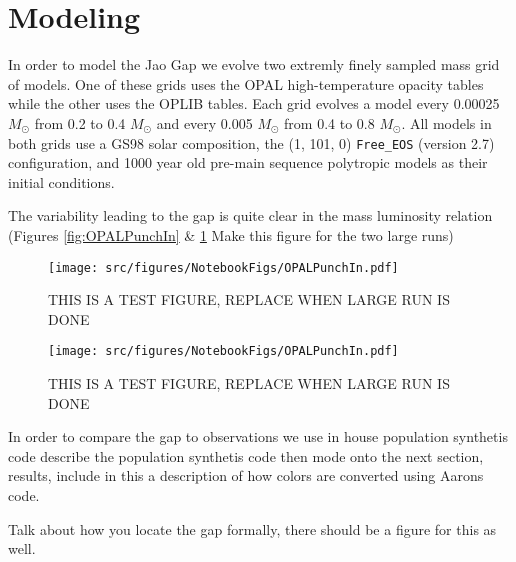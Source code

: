 \section{Modeling}\label{sec:modeling}
In order to model the Jao Gap we evolve two extremly finely sampled mass grid
of models. One of these grids uses the OPAL high-temperature opacity tables
while the other uses the OPLIB tables. Each grid evolves a model every 0.00025
$M_{\odot}$ from 0.2 to 0.4 $M_{\odot}$ and every 0.005 $M_{\odot}$ from 0.4 to
0.8 $M_{\odot}$. All models in both grids use a GS98 solar composition, the (1,
101, 0) \texttt{Free\_EOS} (version {\color{red}2.7}) configuration, and 1000
year old pre-main sequence polytropic models as their initial conditions.

The variability leading to the gap is quite clear in the mass luminosity
relation (Figures \ref{fig:OPALPunchIn} \& \ref{fig:OPLIBPunchIn}
{\color{red} Make this figure for the two large runs})

\begin{figure}
	\centering
	\texttt{[image: src/figures/NotebookFigs/OPALPunchIn.pdf]}
	\caption{{\color{red} THIS IS A TEST FIGURE, REPLACE WHEN LARGE RUN IS DONE}}
	\label{fig:OPALPunchIn}
	\texttt{[image: src/figures/NotebookFigs/OPALPunchIn.pdf]}
	\caption{{\color{red} THIS IS A TEST FIGURE, REPLACE WHEN LARGE RUN IS DONE}}
	\label{fig:OPLIBPunchIn}
		
\end{figure}

In order to compare the gap to observations we use in house population
synthetis code {\color{red} describe the population synthetis code then mode
onto the next section, results, include in this a description of how colors are
converted using Aarons code}.


{\color{red} Talk about how you locate the gap formally, there should be a
figure for this as well.}
